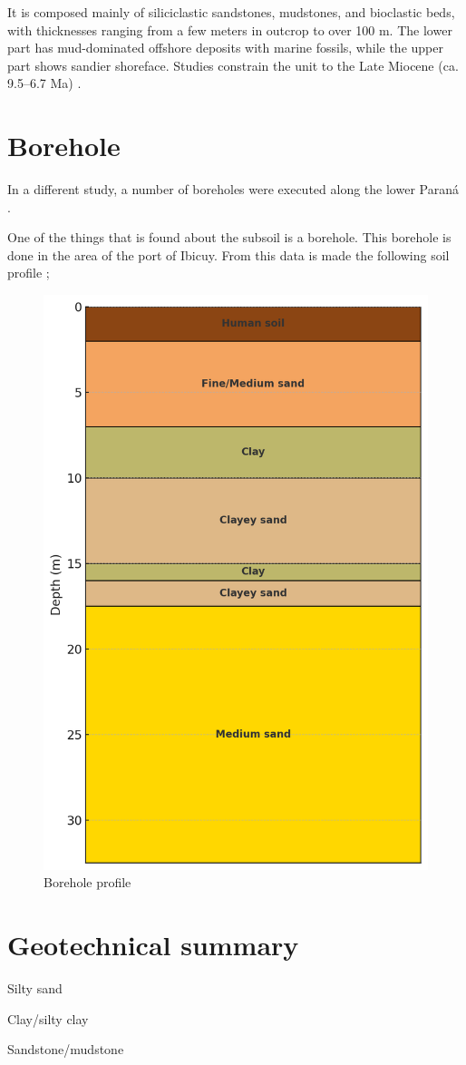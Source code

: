 It is composed mainly of siliciclastic sandstones, mudstones, and bioclastic beds, with thicknesses ranging from a few meters in outcrop to over 100 m. The lower part has mud-dominated offshore deposits with marine fossils, while the upper part shows sandier shoreface. Studies constrain the unit to the Late Miocene (ca. 9.5–6.7 Ma) \autocite{tineoReconstructingSouthAmerican2024}.

\section{Borehole}
In a different study, a number of boreholes were executed along the lower Paraná \autocite{amatoESTRATIGRAFIACUATERNARIASUBSUELO2009}.

One of the things that is found about the subsoil is a borehole. This borehole is done in the area of the port of Ibicuy. From this data is made the following soil profile \autocite{amatoESTRATIGRAFIACUATERNARIASUBSUELO2009};

\begin{figure}[H]
    \centering
    \includegraphics[width=0.45\linewidth]{figures//ch9/Bodemprofiel.png}
    \caption{Borehole profile}
    \label{fig:placeholder}
\end{figure}

\section{Geotechnical summary}
Silty sand

Clay/silty clay

Sandstone/mudstone